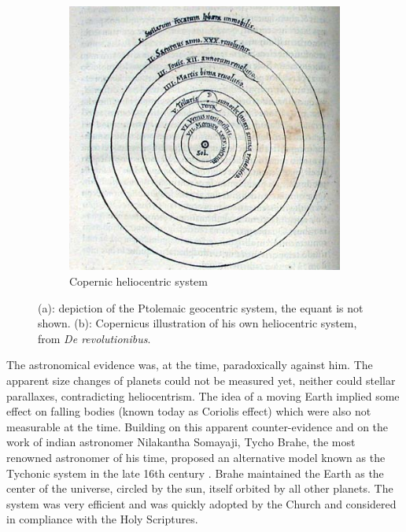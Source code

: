 \begin{figure}
\begin{subfigure}[b]{0.48\textwidth}
    	\includegraphics[width=\linewidth]{Figures/0_CopernicusModel.jpg}
        \caption{Copernic heliocentric system}
        \label{Fig:0_copernicsystem}
    \end{subfigure}
\caption[Ptolemaic and Copernic's systems]{(a): depiction of the Ptolemaic geocentric system, the equant is not shown. (b): Copernicus illustration of his own heliocentric system, from \textit{De revolutionibus}.}
\label{Fig:0_heliogeo}
\end{figure}



The astronomical evidence was, at the time, paradoxically against him. The apparent size changes of planets could not be measured yet, neither could stellar parallaxes, contradicting heliocentrism. The idea of a moving Earth implied some effect on falling bodies (known today as Coriolis effect) which were also not measurable at the time. Building on this apparent counter-evidence and on the work of indian astronomer Nilakantha Somayaji, Tycho Brahe, the most renowned astronomer of his time, proposed an alternative model known as the Tychonic system in the late 16th century \citep{ramasubramanian1998}. Brahe maintained the Earth as the center of the universe, circled by the sun, itself orbited by all other planets. The system was very efficient and was quickly adopted by the Church and considered in compliance with the Holy Scriptures.

